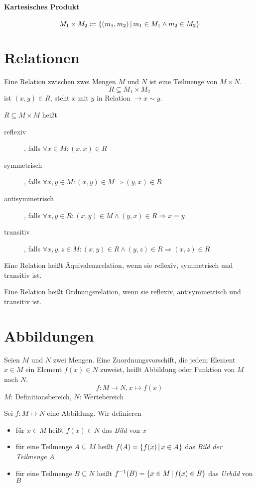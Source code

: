 \paragraph{Kartesisches Produkt}
\begin{equation*}
  M_1 \times M_2 \coloneqq \left\{ (m_1, m_2) \,\middle|\, m_1\in M_1 \wedge m_2\in M_2 \right\}
\end{equation*}

\section{Relationen}
Eine Relation zwischen zwei Mengen $M$ und $N$ ist eine Teilmenge von $M\times N$.
\begin{equation*}
  R\subseteq M_1\times M_2
\end{equation*}
ist $(x, y) \in R$, steht $x$ mit $y$ in Relation $\rightarrow x\sim y$.

$R \subseteq M\times M$ heißt
\begin{description}
  \item[reflexiv], falls $\forall x\in M : (x,x)\in R$
  \item[symmetrisch], falls $\forall x,y \in M : (x,y)\in M \Rightarrow (y,x) \in R$
  \item[antisymmetrisch], falls $\forall x,y \in R : (x,y)\in M \wedge (y,x)\in R \Rightarrow x=y$
  \item[transitiv], falls $\forall x,y,z \in M : (x,y)\in R \wedge (y,z)\in R \Rightarrow (x,z)\in R$
\end{description}

Eine Relation heißt Äquivalenzrelation, wenn sie reflexiv, symmetrisch und transitiv ist.

Eine Relation heißt Ordnungsrelation, wenn sie reflexiv, antisymmetrisch und transitiv ist.

\section{Abbildungen}
Seien $M$ und $N$ zwei Mengen. Eine Zuordnungsvorschift, die jedem Element $x\in M$ ein Element $f(x)\in N$ zuweist, heißt Abbildung oder Funktion von $M$ nach $N$.
\begin{equation*}
  f:M\rightarrow N, x\mapsto f(x)
\end{equation*}
$M$: Definitionsbereich, $N$: Wertebereich

Sei $f:M\mapsto N$ eine Abbildung. Wir definieren
\begin{itemize}
  \item für $x\in M$ heißt $f(x)\in N$ das \emph{Bild} von $x$
  \item für eine Teilmenge $A\subseteq M$ heißt $f(A)=\left\{ f(x) \,\middle|\, x\in A \right\}$ das \emph{Bild der Teilmenge  $A$}
  \item für eine Teilmenge $B\subseteq N$ heißt $f^{-1}(B) = \left\{ x\in M \,\middle|\, f(x)\in B \right\}$ das \emph{Urbild} von $B$
\end{itemize}

